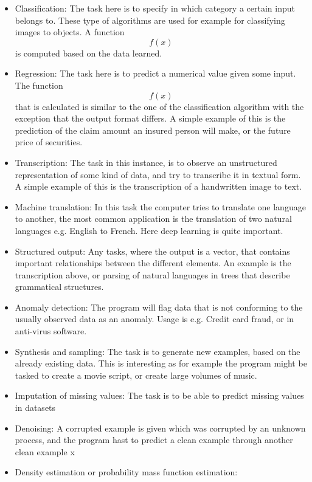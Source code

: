 \documentclass{article}
\begin{document}
\begin{itemize}
    \item Classification: The task here is to specify in which category  a certain input belongs to. These type of algorithms are used for example for classifying images to objects. A function $$f(x)$$ is computed based on the data learned.
    \item Regression: The task here is to predict a numerical value given some input. The function $$f(x)$$ that is calculated is similar to the one of the classification algorithm with the exception that the output format differs. A simple example of this is the prediction of the claim amount an insured person will make, or the future price of securities.
    \item Transcription: The task in this instance, is to observe an unstructured representation of some kind of data, and try to transcribe it in textual form. A simple example of this is the transcription of a handwritten image to text.
    \item Machine translation: In this task the computer tries to translate one language to another, the most common application is the translation of two natural languages e.g. English to French. Here deep learning is quite important.
    \item Structured output: Any tasks, where the output is a vector, that contains important relationships between the different elements. An example is the transcription above, or parsing of natural languages in trees that describe grammatical structures.
    \item Anomaly detection: The program will flag data that is not conforming to the usually observed data as an anomaly. Usage is e.g. Credit card fraud, or in anti-virus software.
    \item Synthesis and sampling: The task is to generate new examples, based on the already existing data. This is interesting as for example the program might be tasked to create a movie script, or create large volumes of music.
    \item Imputation of missing values: The task is to be able to predict missing values in datasets
    \item Denoising: A corrupted example is given which was corrupted by an unknown process, and the program hast to predict a clean example through another clean example x
    \item Density estimation or probability mass function estimation: 
\end{itemize}
\end{document}
